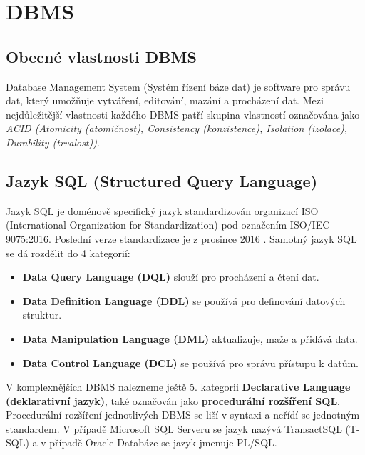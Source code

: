\documentclass[czech,bachelor,public,dept460,male,cpdeclaration,twoside]{diploma}
\begin{document}
\section{DBMS} \label{dbms}
\subsection{Obecné vlastnosti DBMS}
Database Management System (Systém řízení báze dat) je software pro správu dat, který umožňuje vytváření, editování, mazání a procházení dat. Mezi nejdůležitější vlastnosti každého DBMS patří skupina vlastností označována jako \textit{ACID (Atomicity (atomičnost), Consistency (konzistence), Isolation (izolace), Durability (trvalost))}.

\subsection{Jazyk SQL (Structured Query Language)}
Jazyk SQL je doménově specifický jazyk standardizován organizací ISO (International Organization for Standardization) pod označením ISO/IEC 9075:2016. Poslední verze standardizace je z prosince 2016 \cite{sqliso}. Samotný jazyk SQL se dá rozdělit do 4 kategorií:
\begin{itemize}
  \item \textbf{Data Query Language (DQL)} slouží pro procházení a čtení dat.
  \item \textbf{Data Definition Language (DDL)} se používá pro definování datových struktur.
  \item \textbf{Data Manipulation Language (DML)} aktualizuje, maže a přidává data.
  \item \textbf{Data Control Language (DCL)} se používá pro správu přístupu k datům.
\end{itemize}

V komplexnějších DBMS nalezneme ještě 5. kategorii \textbf{Declarative Language (deklarativní jazyk)}, také označován jako \textbf{procedurální rozšíření SQL}. Procedurální rozšíření jednotlivých DBMS se liší v syntaxi a neřídí se jednotným standardem. V případě Microsoft SQL Serveru se jazyk nazývá TransactSQL (T-SQL) a v případě Oracle Databáze se jazyk jmenuje PL/SQL.
\end{document}
